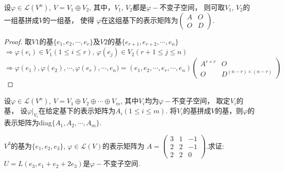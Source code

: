 \begin{theory}
  设$\varphi \in \mathcal{L}(V^n)$, $V = V_1 \oplus V_2$, 
  其中，$V_1$, $V_2$都是$\varphi-\text{不变子空间}$，
  则可取$V_1$, $V_2$的一组基拼成$V$的一组基， 使得
  $\varphi$在这组基下的表示矩阵为$\left(
    \begin{smallmatrix}
      A & O\\
      O & D
    \end{smallmatrix}\right)$. 
\end{theory}

\begin{proof}
  取$V1$的基$\{e_1, e_2, \cdots, e_r\}$及$V2$的基$\{e_{r+1}, e_{r+2}, \cdots, e_n\}$ \\
  $\Longrightarrow \varphi(e_i) \in V_1(1 \leq i \leq r)$, 
  $\varphi(e_j) \in V_2(r+1 \leq j \leq n)$\\
  $\Longrightarrow \varphi(e_1), \varphi(e_2), \cdots, \varphi(e_r), \cdots, e_n)
  = (e_1, e_2, \cdots, e_r, \cdots, e_n)
  \begin{pmatrix}
    A^{r \times r} & O\\
    O & D^{(n-r)\times(n-r)}
  \end{pmatrix}$ 
\end{proof}

\begin{generalize}
  设$\varphi \in \mathcal{L}(V^n)$, $V = V_1 \oplus V_2 \oplus\cdots\oplus V_m$, 
  其中$V_i$均为$\varphi-\text{不变子空间}$， 取定$V_i$的基，
  设$\varphi|_{V_i}$在给定基下的表示矩阵为$A_i(1 \leq i \leq m)$.
  将$V_i$的基拼成$V$的基，则$\varphi$的表示矩阵为diag$\{A_1, A_2, \cdots, A_m\}$. 
\end{generalize}

\begin{example}
  $V^3$的基为$\{e_1, e_2, e_3\}$, $\varphi \in \mathcal{L}(V)$的表示矩阵为
  $A=\begin{pmatrix}
    3 & 1 & -1\\
    2 & 2 & -1\\
    2 & 2 &  0
  \end{pmatrix}$.求证: \\
  $U = L(e_3, e_1+e_2+2e_3)$是$\varphi-\text{不变子空间}$. 
\end{example}

